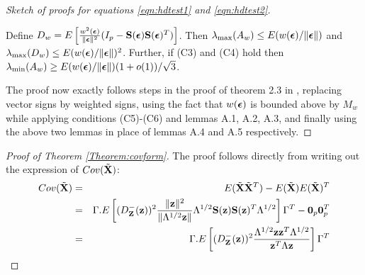 \begin{proof}[Sketch of proofs for equations \ref{eqn:hdtest1} and \ref{eqn:hdtest2}]
\begin{Lemma}
Define $D_w = E \left[ \frac{w^2({\boldsymbol{\epsilon}})}{\| {\boldsymbol{\epsilon}} \|^2} (I_p - {\mathbf{S}}({\boldsymbol{\epsilon}}) {\mathbf{S}}({\boldsymbol{\epsilon}})^T )\right] $. Then $\lambda_{\max} (A_w) \leq E( w({\boldsymbol{\epsilon}})/\| {\boldsymbol{\epsilon}} \|)$ and $\lambda_{\max} (D_w) \leq E( w({\boldsymbol{\epsilon}})/\| {\boldsymbol{\epsilon}} \|)^2$. Further, if (C3) and (C4) hold then $\lambda_{\min} (A_w) \geq E( w({\boldsymbol{\epsilon}})/\| {\boldsymbol{\epsilon}} \|)(1+o(1))/\sqrt 3$.
\end{Lemma}
%
The proof now exactly follows steps in the proof of theorem 2.3 in \cite{WangPengLi15}, replacing vector signs by weighted signs, using the fact that $w({\boldsymbol{\epsilon}})$ is bounded above by $M_w$ while applying conditions (C5)-(C6) and lemmas A.1, A.2, A.3, and finally using the above two lemmas in place of lemmas A.4 and A.5 respectively.
\end{proof}

\begin{proof}[Proof of Theorem  \ref{Theorem:covform}]
The proof follows directly from writing out the expression of $Cov ( \tilde {{\mathbf{X}}})$:
%
\begin{eqnarray*}
Cov(\tilde{{\mathbf{X}}}) &=& E(\tilde{{\mathbf{X}}} \tilde{{\mathbf{X}}}^T) - E(\tilde{{\mathbf{X}}}) E(\tilde{{\mathbf{X}}})^T\\
&=& \Gamma . E \left[ (D^-_{\mathbf{Z}}({\bf{z}}))^2 \frac{\|{\bf{z}}\|^2}{\| \Lambda^{1/2}{\bf{z}}\|} \Lambda^{1/2} {\mathbf{S}}({\bf{z}}) {\mathbf{S}}({\bf{z}})^T \Lambda^{1/2} \right] \Gamma^T - {\bf 0}_p {\bf 0}_p^T\\
&=& \Gamma .E \left[ (D^-_{\mathbf{Z}}({\bf{z}}))^2 \frac{\Lambda^{1/2} {\bf{z}} {\bf{z}}^T \Lambda^{1/2}}{{\bf{z}}^T \Lambda {\bf{z}}} \right] \Gamma^T
\end{eqnarray*}
%
\end{proof}

